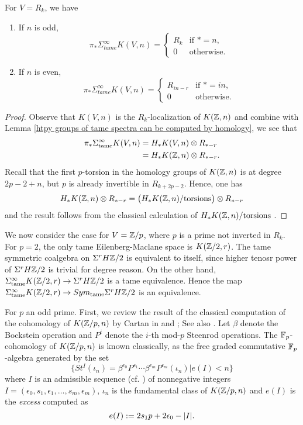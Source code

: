\begin{lemma}
	For $V=R_k$, we have
\begin{enumerate}
	\item If $n$ is odd,
	 $$
	 \pi_* \Sigma_{tame}^{\infty}K(V,n) =
	 \begin{cases}
		R_k & \text{if $*=n$,}\\
		0 & \text{otherwise}.
	 \end{cases}
	 $$
	\item If $n$ is even,
	$$
	 \pi_* \Sigma_{tame}^{\infty}K(V,n) =
	 \begin{cases}
		R_{in-r} & \text{if $*=in$,}\\
		0 & \text{otherwise}.
	 \end{cases}
	 $$
\end{enumerate}
\end{lemma}
\begin{proof}
Observe that $K(V,n)$ is the $R_k$-localization of $K({\mathbb{Z}},n)$ and combine with Lemma \ref{htpy groups of tame spectra can be computed by homology}, we see that 
	\begin{align*}
		\pi_* \Sigma_{\operatorname{\operatorname{tame}}}^{\infty}K(V, n) & = H_* K(V, n)\otimes R_{*-r}\\
		& = H_* K({\mathbb{Z}}, n)\otimes R_{*-r}.
	\end{align*}
	Recall that the first $p$-torsion in the homology groups of $K({\mathbb{Z}}, n)$ is at degree $2p-2+n$, but $p$ is already invertible in $R_{k+2p-2}$. 
	Hence, one has
	$$
	H_* K({\mathbb{Z}},n)\otimes R_{*-r} = \big(H_* K({\mathbb{Z}},n)/\text{torsions}\big) \otimes R_{*-r}
	$$ and the result follows from the classical calculation of $H_* K({\mathbb{Z}},n)/\text{torsions}$ \cite[Proposition 1.20]{Hatcher}. 
\end{proof}


We now consider the case for $V={\mathbb{Z}}/p$,
where $p$ is a prime not inverted in $R_k$.
For $p=2$, the only tame Eilenberg-Maclane space is $K({\mathbb{Z}}/2, r)$. The tame symmetric coalgebra on $\Sigma^r H{\mathbb{Z}}/2$ is equivalent to itself, since higher tenosr power of $\Sigma^r H{\mathbb{Z}}/2$ is trivial for degree reason. On the other hand, $\Sigma_{\operatorname{\operatorname{tame}}}^{\infty}K({\mathbb{Z}}/2,r)\to \Sigma^r H{\mathbb{Z}}/2$ is a tame equivalence.
Hence the map
$
 \Sigma_{\operatorname{\operatorname{tame}}}^{\infty}K({\mathbb{Z}}/2,r)\to \\Sym_{\operatorname{\operatorname{tame}}} \Sigma^{r}H{\mathbb{Z}}/2
$
is an equivalence.
 
For $p$ an odd prime.
First, we review the result of the classical computation of the cohomology of $K({\mathbb{Z}}/p,n)$ by Cartan in \cite{Cartan_I} and \cite{Cartan_II}; See also \cite[Chapter 6]{McCleary_SS}.
Let $\beta$ denote the Bockstein operation and $P^i$ denote the $i$-th mod-$p$ Steenrod operations.
The ${\mathbb{F}}_p$-cohomology of $K({\mathbb{Z}}/p,n)$ is known classically, as the free graded commutative ${\mathbb{F}}_p$-algebra generated by the set 
$$
\{
St^I(\iota_n)=\beta^{\epsilon_0}P^{s_1}\cdots \beta^{\epsilon_m}P^{\epsilon_m}(\iota_n) |
e(I)<n 
\}
$$
where $I$ is an admissible sequence (cf. \cite[Theorem 4.46]{McCleary_SS}) of nonnegative integers $I = (\epsilon_0, s_1, \epsilon_1, \dots, s_m, \epsilon_m)$,  $\iota_n$ is the fundamental class of $K({\mathbb{Z}}/p,n)$ and $e(I)$ is the \emph{excess} computed as
\[
e(I):=2s_1p+2\epsilon_0-\lvert I\rvert.
\]

